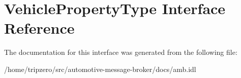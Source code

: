 \hypertarget{interfaceVehiclePropertyType}{\section{Vehicle\-Property\-Type Interface Reference}
\label{interfaceVehiclePropertyType}
}


The documentation for this interface was generated from the following file\-:\begin{DoxyCompactItemize}
\item 
/home/tripzero/src/automotive-\/message-\/broker/docs/amb.\-idl\end{DoxyCompactItemize}
